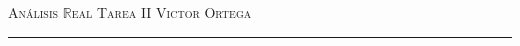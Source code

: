 \documentclass[12pt]{article}
\newcommand\R{\ensuremath{\mathbb{R}}}
\begin{document}
\thispagestyle{empty}

{\scshape Análisis $\R$eal} \hfill {\scshape \large Tarea II} \hfill {\scshape Victor Ortega}
 
\smallskip

\hrule

\bigskip

\bigskip

\theoremstyle{definition}
\newtheorem*{definition}{Definición}

\theoremstyle{definition}
\newtheorem*{dem}{Demostración}

\theoremstyle{definition}
\newtheorem*{notation}{Notación}

\theoremstyle{definition}
\newtheorem*{theorem}{Teorema}

\theoremstyle{definition}
\newtheorem*{lema}{Lema}

\theoremstyle{remark}
\newtheorem*{observation}{Observación}

\theoremstyle{remark}
\newtheorem*{example}{Ejemplo}
\end{document}
